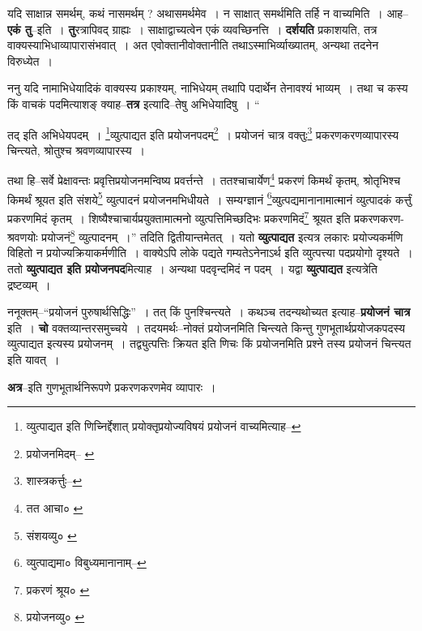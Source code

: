 \documentclass[article,12pt,a4paper]{memoir}
\begin{document}
	  \pstart यदि साक्षान्न समर्थम्, कथं नासमर्थम् ? अथासमर्थमेव । न साक्षात् समर्थमिति तर्हि न वाच्यमिति । आह--\textbf{एकं तु}--इति । \textbf{तु}रत्रापिवद् ग्राह्यः । साक्षाद्वाच्यत्वेन एकं व्यवच्छिनत्ति । \textbf{दर्शयति} प्रकाशयति, तत्र वाक्यस्याभिधाव्यापारासंभवात् । अत एवोक्तानीवोक्तानीति तथाऽस्माभिर्व्याख्यातम्, अन्यथा तदनेन विरुध्येत ।
	\pend
      

	  \pstart ननु यदि नामाभिधेयादिकं वाक्यस्य प्रकाश्यम्, नाभिधेयम् तथापि पदार्थेन तेनावश्यं भाव्यम् । तथा च कस्य किं वाचकं पदमित्याशङ् क्याह--\textbf{तत्र} इत्यादि--तेषु अभिधेयादिषु ।  \leavevmode{} “
	  
	तद् इति अभिधेयपदम् । \footnote{व्युत्पाद्यत इति णिच्निर्द्देशात् प्रयोक्तृप्रयोज्यविषयं प्रयोजनं वाच्यमित्याह--\cite{dp-msD-n}}\-व्युत्पाद्यत इति प्रयोजनपदम्\footnote{प्रयोजनमिदम्--\cite{dp-msA} \cite{dp-edP} \cite{dp-edH}} । प्रयोजनं चात्र वक्तुः\footnote{शास्त्रकर्त्तुः--\cite{dp-msD-n}} प्रकरणकरणव्यापारस्य चिन्त्यते, श्रोतुश्च श्रवणव्यापारस्य । 
	  
	तथा हि--सर्वे प्रेक्षावन्तः प्रवृत्तिप्रयोजनमन्विष्य प्रवर्त्तन्ते । ततश्चाचार्येण\footnote{तत आचा० \cite{dp-msA} \cite{dp-edP}} प्रकरणं किमर्थं कृतम्, श्रोतृभिश्च किमर्थं श्रूयत इति संशये\footnote{संशयव्यु० \cite{dp-edP} \cite{dp-edH}} व्युत्पादनं प्रयोजनमभिधीयते । सम्यग्ज्ञानं \footnote{व्युत्पाद्यमा० \cite{dp-msB} \cite{dp-edE} \cite{dp-edH} \cite{dp-edN} विबुध्यमानानाम्--\cite{dp-msD-n}}\-व्युत्पद्यमानानामात्मानं व्युत्पादकं कर्त्तुं प्रकरणमिदं कृतम् । शिष्यैश्चाचार्यप्रयुक्तामात्मनो व्युत्पत्तिमिच्छदिभः प्रकरणमिदं\footnote{प्रकरणं श्रूय० \cite{dp-msC} \cite{dp-msD} \cite{dp-msB}} श्रूयत इति प्रकरणकरण-श्रवणयोः प्रयोजनं\footnote{प्रयोजनव्यु० \cite{dp-edH} \cite{dp-edN}} व्युत्पादनम् ।” तदिति द्वितीयान्तमेतत् । यतो \textbf{व्युत्पाद्यत} इत्यत्र लकारः प्रयोज्यकर्मणि विहितो न प्रयोज्यक्रियाकर्मणीति । वाक्येऽपि लोके पद्यते गम्यतेऽनेनाऽर्थ इति व्युत्पत्त्या पदप्रयोगो दृश्यते । ततो \textbf{व्युत्पाद्यत इति प्रयोजनपद}मित्याह । अन्यथा पदवृन्दमिदं न पदम् । यद्वा \textbf{व्युत्पाद्यत} इत्यत्रेति द्रष्टव्यम् ।
	\pend
      

	  \pstart ननूक्तम्--“प्रयोजनं पुरुषार्थसिद्धिः” । तत् किं पुनश्चिन्त्यते । कथञ्च तदन्यथोच्यत इत्याह--\textbf{प्रयोजनं चात्र} इति । \textbf{चो} वक्तव्यान्तरसमुच्चये । तदयमर्थः--नोक्तं प्रयोजनमिति चिन्त्यते किन्तु गुणभूतार्थप्रयोजकपदस्य व्युत्पाद्यत इत्यस्य प्रयोजनम् । तद्व्युत्पत्तिः क्रियत इति णिचः किं प्रयोजनमिति प्रश्ने तस्य प्रयोजनं चिन्त्यत इति यावत् ।
	\pend
      

	  \pstart \textbf{अत्र}--इति गुणभूतार्थनिरूपणे प्रकरणकरणमेव व्यापारः ।
	\pend
      
\end{document}
